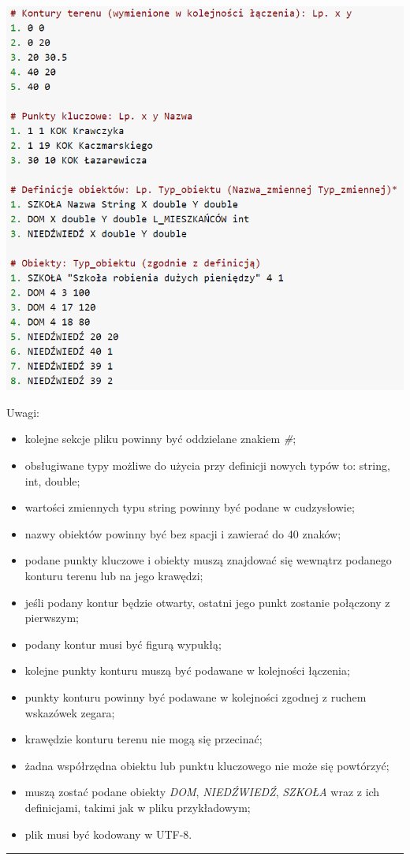 \documentclass[a4paper,11pt]{article}
\newcommand{\linia}{\rule{\linewidth}{0.4mm}}
\begin{document}
\includegraphics[scale=0.70]{ExampleInputFile}

\noindent
Uwagi:
\begin{itemize}
\item kolejne sekcje pliku powinny być oddzielane znakiem \textit{\#};
\item obsługiwane typy możliwe do użycia przy definicji nowych typów to: string, int, double;
\item wartości zmiennych typu string powinny być podane w cudzysłowie;
\item nazwy obiektów powinny być bez spacji i zawierać do 40 znaków;
\item podane punkty kluczowe i obiekty muszą znajdować się wewnątrz podanego konturu terenu lub na jego krawędzi;
\item jeśli podany kontur będzie otwarty, ostatni jego punkt zostanie połączony z pierwszym;
\item podany kontur musi być figurą wypukłą;
\item kolejne punkty konturu muszą być podawane w kolejności łączenia;
\item punkty konturu powinny być podawane w kolejności zgodnej z ruchem wskazówek zegara;
\item krawędzie konturu terenu nie mogą się przecinać;
\item żadna współrzędna obiektu lub punktu kluczowego nie może się powtórzyć;
\item muszą zostać podane obiekty \textit{DOM}, \textit{NIEDŹWIEDŹ}, \textit{SZKOŁA} wraz z ich definicjami, takimi jak w pliku przykładowym;
\item plik musi być kodowany w UTF-8.
\end{itemize}
\noindent\linia
\end{document}
